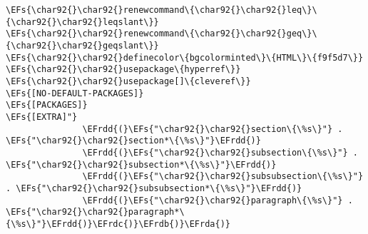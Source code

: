 \documentclass[c]{article}
\theoremstyle{plain}%
\theoremstyle{definition}
\theoremstyle{remark}
\newcommand{\EFs}[1]{\textcolor{EFs}{#1}} %
\newcommand{\EFrda}[1]{\textcolor{EFrda}{#1}} %
\newcommand{\EFrdb}[1]{\textcolor{EFrdb}{#1}} %
\newcommand{\EFrdc}[1]{\textcolor{EFrdc}{#1}} %
\newcommand{\EFrdd}[1]{\textcolor{EFrdd}{#1}} %
\begin{document}
\begin{Code}
\begin{Verbatim}
\EFs{\char92{}\char92{}renewcommand\{\char92{}\char92{}leq\}\{\char92{}\char92{}leqslant\}}
\EFs{\char92{}\char92{}renewcommand\{\char92{}\char92{}geq\}\{\char92{}\char92{}geqslant\}}
\EFs{\char92{}\char92{}definecolor\{bgcolorminted\}\{HTML\}\{f9f5d7\}}
\EFs{\char92{}\char92{}usepackage\{hyperref\}}
\EFs{\char92{}\char92{}usepackage[]\{cleveref\}}
\EFs{[NO-DEFAULT-PACKAGES]}
\EFs{[PACKAGES]}
\EFs{[EXTRA]"}
               \EFrdd{(}\EFs{"\char92{}\char92{}section\{\%s\}"} . \EFs{"\char92{}\char92{}section*\{\%s\}"}\EFrdd{)}
               \EFrdd{(}\EFs{"\char92{}\char92{}subsection\{\%s\}"} . \EFs{"\char92{}\char92{}subsection*\{\%s\}"}\EFrdd{)}
               \EFrdd{(}\EFs{"\char92{}\char92{}subsubsection\{\%s\}"} . \EFs{"\char92{}\char92{}subsubsection*\{\%s\}"}\EFrdd{)}
               \EFrdd{(}\EFs{"\char92{}\char92{}paragraph\{\%s\}"} . \EFs{"\char92{}\char92{}paragraph*\{\%s\}"}\EFrdd{)}\EFrdc{)}\EFrdb{)}\EFrda{)}
\end{Verbatim}
\end{Code}
\end{document}
